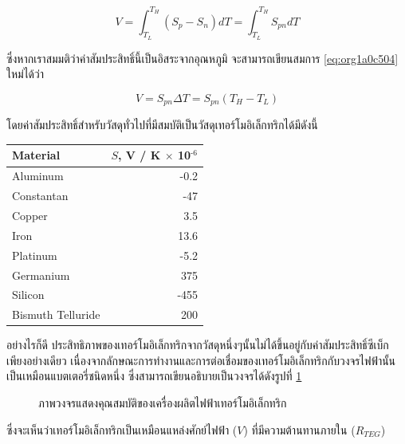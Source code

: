 \documentclass[a4paper,nobib,openany,10pt]{tufte-book}
\begin{document}
\begin{equation}
\label{eq:org1a0c504}
  V = \int_{T_L}^{T_H} \left( S_p - S_n \right) dT = \int_{T_L}^{T_H} S_{pn} dT
\end{equation}

ซึ่งหากเราสมมติว่าค่าสัมประสิทธิ์นี้เป็นอิสระจากอุณหภูมิ จะสามารถเขียนสมการ \ref{eq:org1a0c504} ใหม่ได้ว่า

\[V = S_{pn} \Delta T = S_{pn} \left( T_H - T_L \right)\]

โดยค่าสัมประสิทธิ์สำหรับวัสดุทั่วไปที่มีสมบัติเป็นวัสดุเทอร์โมอิเล็กทริกได้มีดังนี้

\begin{center}
\begin{tabular}{lr}
\toprule
Material & \(S\), V / K \(\times\) 10\(^{\text{-6}}\)\\
\midrule
Aluminum & -0.2\\
Constantan & -47\\
Copper & 3.5\\
Iron & 13.6\\
Platinum & -5.2\\
Germanium & 375\\
Silicon & -455\\
Bismuth Telluride & 200\\
\bottomrule
\end{tabular}
\end{center}

อย่างไรก็ดี ประสิทธิภาพของเทอร์โมอิเล็กทริกจากวัสดุหนึ่งๆนั้นไม่ได้ขึ้นอยู่กับค่าสัมประสิทธิ์ซีเบ็กเพียงอย่างเดียว เนื่องจากลักษณะการทำงานและการต่อเชื่อมของเทอร์โมอิเล็กทริกกับวงจรไฟฟ้านั้นเป็นเหมือนแบตเตอรี่ชนิดหนึ่ง ซึ่งสามารถเขียนอธิบายเป็นวงจรได้ดังรูปที่ \ref{fig: thermoelectric circuit}

\begin{figure}[h]
  \centering
\caption{\label{fig: thermoelectric circuit}ภาพวงจรแสดงคุณสมบัติของเครื่องผลิตไฟฟ้าเทอร์โมอิเล็กทริก}
\end{figure}

ซึ่งจะเห็นว่าเทอร์โมอิเล็กทริกเป็นเหมือนแหล่งศักย์ไฟฟ้า (\(V\))
ที่มีความต้านทานภายใน (\(R_{TEG}\))
\end{document}
